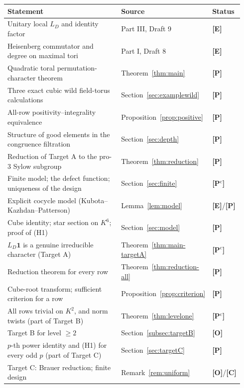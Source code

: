 \documentclass[11pt]{article}
\newcommand{\Ptag}{\textnormal{\textbf{[P]}}}
\newcommand{\Pctag}{\textnormal{\textbf{[P$^{\mathrm c}$]}}}
\newcommand{\Etag}{\textnormal{\textbf{[E]}}}
\newcommand{\Otag}{\textnormal{\textbf{[O]}}}
\newcommand{\Ctag}{\textnormal{\textbf{[C]}}}
\theoremstyle{plain}
\theoremstyle{definition}
\begin{document}
\begin{center}\small
\begin{tabular}{@{}p{0.60\linewidth}p{0.26\linewidth}p{0.08\linewidth}@{}}
\toprule
Statement & Source & Status\\\midrule
Unitary local $L_D$ and identity factor & Part III, Draft 9 & \Etag\\
Heisenberg commutator and degree on maximal tori & Part I, Draft 8 & \Etag\\
Quadratic toral permutation-character theorem & Theorem~\ref{thm:main} & \Ptag\\
Three exact cubic wild field-torus calculations & Section~\ref{sec:examplewild} & \Ptag\\
All-row positivity--integrality equivalence & Proposition~\ref{prop:positive} & \Ptag\\
Structure of good elements in the congruence filtration & Section~\ref{sec:depth} & \Ptag\\
Reduction of Target A to the pro-$3$ Sylow subgroup & Theorem~\ref{thm:reduction} & \Ptag\\
Finite model; the defect function; uniqueness of the design & Section~\ref{sec:finite} & \Pctag\\
Explicit cocycle model (Kubota--Kazhdan--Patterson) & Lemma~\ref{lem:model} & \Etag/\Ptag\\
Cube identity; star section on $K^6$; proof of (H1) & Section~\ref{sec:model} & \Ptag\\
$L_D\mathbf1$ is a genuine irreducible character (Target A) & Theorem~\ref{thm:main-targetA} & \Pctag\\
Reduction theorem for every row & Theorem~\ref{thm:reduction-all} & \Ptag\\
Cube-root transform; sufficient criterion for a row & Proposition~\ref{prop:criterion} & \Ptag\\
All rows trivial on $K^2$, and norm twists (part of Target B) & Theorem~\ref{thm:levelone} & \Pctag\\
Target B for level $\ge2$ & Section~\ref{subsec:targetB} & \Otag\\
$p$-th power identity and (H1) for every odd $p$ (part of Target C) & Section~\ref{sec:targetC} & \Ptag\\
Target C: Brauer reduction; finite design & Remark~\ref{rem:uniform} & \Otag/\Ctag\\
\bottomrule
\end{tabular}
\end{center}
\end{document}

